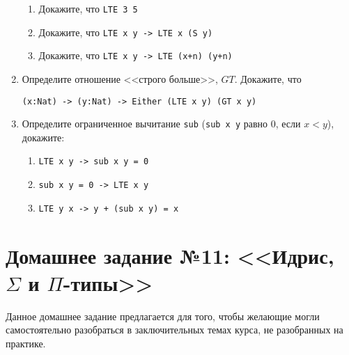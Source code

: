 \documentclass[10pt,a4paper,oneside]{article}
\begin{document}
\begin{enumerate}
\begin{enumerate}
\item Докажите, что \verb!LTE 3 5!
\item Докажите, что \verb!LTE x y -> LTE x (S y)!
\item Докажите, что \verb!LTE x y -> LTE (x+n) (y+n)!
\end{enumerate}

\item Определите отношение <<строго больше>>, $GT$. Докажите, что

\verb!(x:Nat) -> (y:Nat) -> Either (LTE x y) (GT x y)!

\item Определите ограниченное вычитание \verb!sub! (\verb!sub x y! равно 0, если $x < y$), 
докажите:
\begin{enumerate}
\item \verb!LTE x y -> sub x y = 0!
\item \verb!sub x y = 0 -> LTE x y!
\item \verb!LTE y x -> y + (sub x y) = x!
\end{enumerate}

\end{enumerate}

\section*{Домашнее задание №11: <<Идрис, $\Sigma$ и $\Pi$-типы>>}

Данное домашнее задание предлагается для того, чтобы желающие могли самостоятельно
разобраться в заключительных темах курса, не разобранных на практике.
\end{document}

